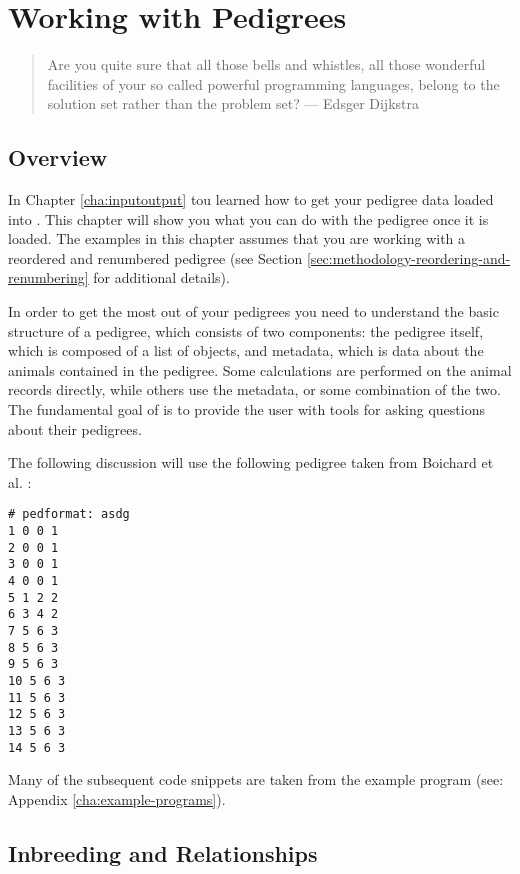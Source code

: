 \chapter{Working with Pedigrees}
\label{cha:computing}
\begin{quote}
 Are you quite sure that all those bells and whistles, all those wonderful facilities of your so called powerful programming languages, belong to the solution set rather than the problem set? --- Edsger Dijkstra
\end{quote}
\section{Overview}\label{sec:computing-overview}
In Chapter \ref{cha:inputoutput} tou learned how to get your pedigree data loaded into \PyPedal{}. This chapter will show you what you can do with the pedigree once it is loaded. The examples in this chapter assumes that you are working with a reordered and renumbered pedigree (see Section \ref{sec:methodology-reordering-and-renumbering} for additional details).

In order to get the most out of your pedigrees you need to understand the basic structure of a \PyPedal{} pedigree, which consists of two components: the pedigree itself, which is composed of a list of  objects, and metadata, which is data about the animals contained in the pedigree. Some calculations are performed on the animal records directly, while others use the metadata, or some combination of the two. The fundamental goal of \PyPedal{} is to provide the user with tools for asking questions about their pedigrees.

The following discussion will use the following pedigree taken from Boichard et al. \citeyear{ref352}:
\begin{verbatim}
# pedformat: asdg
1 0 0 1
2 0 0 1
3 0 0 1
4 0 0 1
5 1 2 2
6 3 4 2
7 5 6 3
8 5 6 3
9 5 6 3
10 5 6 3
11 5 6 3
12 5 6 3
13 5 6 3
14 5 6 3
\end{verbatim}
Many of the subsequent code snippets are taken from the  example program (see: Appendix \ref{cha:example-programs}). 

\section{Inbreeding and Relationships}\label{sec:computing-inbreeding}

